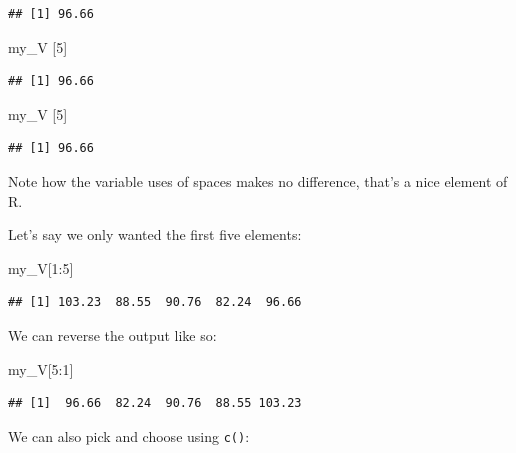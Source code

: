 \documentclass[
]{book}
\newenvironment{Shaded}{\begin{snugshade}}{\end{snugshade}}
\newcommand{\DecValTok}[1]{\textcolor[rgb]{0.00,0.00,0.81}{#1}}
\newcommand{\NormalTok}[1]{#1}
\newcommand{\SpecialCharTok}[1]{\textcolor[rgb]{0.00,0.00,0.00}{#1}}
\begin{document}
\begin{verbatim}
## [1] 96.66
\end{verbatim}

\begin{Shaded}
\begin{Highlighting}[]
\NormalTok{my\_V      [}\DecValTok{5}\NormalTok{]}
\end{Highlighting}
\end{Shaded}

\begin{verbatim}
## [1] 96.66
\end{verbatim}

\begin{Shaded}
\begin{Highlighting}[]
\NormalTok{my\_V            [}\DecValTok{5}\NormalTok{]}
\end{Highlighting}
\end{Shaded}

\begin{verbatim}
## [1] 96.66
\end{verbatim}

Note how the variable uses of spaces makes no difference, that's a nice element of R.

Let's say we only wanted the first five elements:

\begin{Shaded}
\begin{Highlighting}[]
\NormalTok{my\_V[}\DecValTok{1}\SpecialCharTok{:}\DecValTok{5}\NormalTok{]}
\end{Highlighting}
\end{Shaded}

\begin{verbatim}
## [1] 103.23  88.55  90.76  82.24  96.66
\end{verbatim}

We can reverse the output like so:

\begin{Shaded}
\begin{Highlighting}[]
\NormalTok{my\_V[}\DecValTok{5}\SpecialCharTok{:}\DecValTok{1}\NormalTok{]}
\end{Highlighting}
\end{Shaded}

\begin{verbatim}
## [1]  96.66  82.24  90.76  88.55 103.23
\end{verbatim}

We can also pick and choose using \texttt{c()}:
\end{document}
